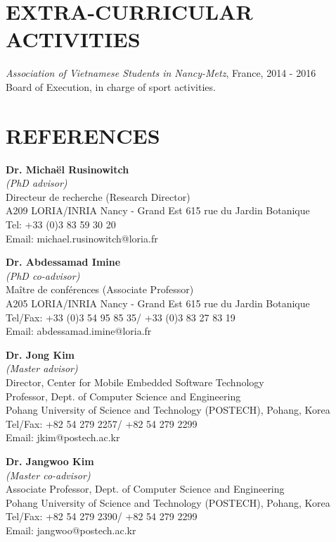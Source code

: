 \documentclass[margin, 10pt]{res} %
\begin{document}
\begin{resume}
\section{EXTRA-CURRICULAR \\ ACTIVITIES} 
\textit{Association of Vietnamese Students in Nancy-Metz}, France, \hfill 2014 - 2016\\
Board of Execution, in charge of sport activities.

 

\section{REFERENCES}
\textbf{Dr. Micha\"{e}l Rusinowitch} \\
\textit{(PhD advisor)} \\
Directeur de recherche (Research Director) \\
A209 LORIA/INRIA Nancy - Grand Est 615 rue du Jardin Botanique \\
Tel: +33 (0)3 83 59 30 20 \\
Email: michael.rusinowitch@loria.fr


\textbf{Dr. Abdessamad Imine} \\
\textit{(PhD co-advisor)} \\
Maître de conférences (Associate Professor) \\
A205 LORIA/INRIA Nancy - Grand Est 615 rue du Jardin Botanique \\
Tel/Fax: +33 (0)3 54 95 85 35/ +33 (0)3 83 27 83 19 \\
Email: abdessamad.imine@loria.fr


\textbf{Dr. Jong Kim} \\
\textit{(Master advisor)} \\
Director, Center for Mobile Embedded Software Technology \\
Professor, Dept. of Computer Science and Engineering \\
Pohang University of Science and Technology (POSTECH), Pohang, Korea \\
Tel/Fax: +82 54 279 2257/ +82 54 279 2299 \\
Email: jkim@postech.ac.kr  


\textbf{Dr. Jangwoo Kim} \\
\textit{(Master co-advisor)} \\
Associate Professor, Dept. of Computer Science and Engineering \\
Pohang University of Science and Technology (POSTECH), Pohang, Korea \\
Tel/Fax: +82 54 279 2390/ +82 54 279 2299 \\
Email: jangwoo@postech.ac.kr 




\end{resume}
\end{document}
